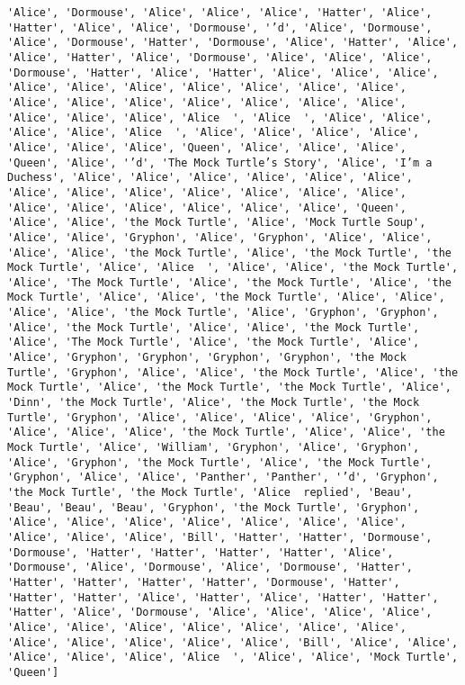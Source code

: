 \documentclass[11pt]{article}
\begin{document}
\begin{Verbatim}[commandchars=\\\{\}]
'Alice', 'Dormouse', 'Alice', 'Alice', 'Alice', 'Hatter', 'Alice', 'Hatter', 'Alice', 'Alice', 'Dormouse', '’d', 'Alice', 'Dormouse', 'Alice', 'Dormouse', 'Hatter', 'Dormouse', 'Alice', 'Hatter', 'Alice', 'Alice', 'Hatter', 'Alice', 'Dormouse', 'Alice', 'Alice', 'Alice', 'Dormouse', 'Hatter', 'Alice', 'Hatter', 'Alice', 'Alice', 'Alice', 'Alice', 'Alice', 'Alice', 'Alice', 'Alice', 'Alice', 'Alice', 'Alice', 'Alice', 'Alice', 'Alice', 'Alice', 'Alice', 'Alice', 'Alice', 'Alice', 'Alice', 'Alice  ', 'Alice  ', 'Alice', 'Alice', 'Alice', 'Alice', 'Alice  ', 'Alice', 'Alice', 'Alice', 'Alice', 'Alice', 'Alice', 'Alice', 'Queen', 'Alice', 'Alice', 'Alice', 'Queen', 'Alice', '’d', 'The Mock Turtle’s Story', 'Alice', 'I’m a Duchess', 'Alice', 'Alice', 'Alice', 'Alice', 'Alice', 'Alice', 'Alice', 'Alice', 'Alice', 'Alice', 'Alice', 'Alice', 'Alice', 'Alice', 'Alice', 'Alice', 'Alice', 'Alice', 'Alice', 'Queen', 'Alice', 'Alice', 'the Mock Turtle', 'Alice', 'Mock Turtle Soup', 'Alice', 'Alice', 'Gryphon', 'Alice', 'Gryphon', 'Alice', 'Alice', 'Alice', 'Alice', 'the Mock Turtle', 'Alice', 'the Mock Turtle', 'the Mock Turtle', 'Alice', 'Alice  ', 'Alice', 'Alice', 'the Mock Turtle', 'Alice', 'The Mock Turtle', 'Alice', 'the Mock Turtle', 'Alice', 'the Mock Turtle', 'Alice', 'Alice', 'the Mock Turtle', 'Alice', 'Alice', 'Alice', 'Alice', 'the Mock Turtle', 'Alice', 'Gryphon', 'Gryphon', 'Alice', 'the Mock Turtle', 'Alice', 'Alice', 'the Mock Turtle', 'Alice', 'The Mock Turtle', 'Alice', 'the Mock Turtle', 'Alice', 'Alice', 'Gryphon', 'Gryphon', 'Gryphon', 'Gryphon', 'the Mock Turtle', 'Gryphon', 'Alice', 'Alice', 'the Mock Turtle', 'Alice', 'the Mock Turtle', 'Alice', 'the Mock Turtle', 'the Mock Turtle', 'Alice', 'Dinn', 'the Mock Turtle', 'Alice', 'the Mock Turtle', 'the Mock Turtle', 'Gryphon', 'Alice', 'Alice', 'Alice', 'Alice', 'Gryphon', 'Alice', 'Alice', 'Alice', 'the Mock Turtle', 'Alice', 'Alice', 'the Mock Turtle', 'Alice', 'William', 'Gryphon', 'Alice', 'Gryphon', 'Alice', 'Gryphon', 'the Mock Turtle', 'Alice', 'the Mock Turtle', 'Gryphon', 'Alice', 'Alice', 'Panther', 'Panther', '’d', 'Gryphon', 'the Mock Turtle', 'the Mock Turtle', 'Alice  replied', 'Beau', 'Beau', 'Beau', 'Beau', 'Gryphon', 'the Mock Turtle', 'Gryphon', 'Alice', 'Alice', 'Alice', 'Alice', 'Alice', 'Alice', 'Alice', 'Alice', 'Alice', 'Alice', 'Bill', 'Hatter', 'Hatter', 'Dormouse', 'Dormouse', 'Hatter', 'Hatter', 'Hatter', 'Hatter', 'Alice', 'Dormouse', 'Alice', 'Dormouse', 'Alice', 'Dormouse', 'Hatter', 'Hatter', 'Hatter', 'Hatter', 'Hatter', 'Dormouse', 'Hatter', 'Hatter', 'Hatter', 'Alice', 'Hatter', 'Alice', 'Hatter', 'Hatter', 'Hatter', 'Alice', 'Dormouse', 'Alice', 'Alice', 'Alice', 'Alice', 'Alice', 'Alice', 'Alice', 'Alice', 'Alice', 'Alice', 'Alice', 'Alice', 'Alice', 'Alice', 'Alice', 'Alice', 'Bill', 'Alice', 'Alice', 'Alice', 'Alice', 'Alice', 'Alice  ', 'Alice', 'Alice', 'Mock Turtle', 'Queen']

    \end{Verbatim}
\end{document}
